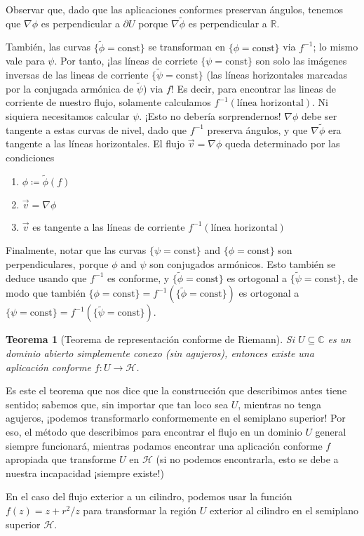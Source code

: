 \documentclass{article}
\newcommand{\realNumbers}{\mathbb{R}}
\newcommand{\complexNumbers}{\mathbb{C}}
\newcommand{\upperHalfPlane}{\mathcal{H}}
\newtheorem{theorem}{Teorema}
\theoremstyle{remark}
\begin{document}
  Observar que, dado que las aplicaciones conformes preservan ángulos, tenemos que \(\nabla \phi\) es perpendicular a \(\partial U\) porque \(\nabla \tilde{\phi}\) es perpendicular a \(\realNumbers\).

  También, las curvas \(\{\tilde{\phi} = \text{const}\}\) se transforman en \(\{\phi = \text{const}\}\) via \(f^{- 1}\);
  lo mismo vale para \(\psi\).
  Por tanto, ¡las líneas de corriete \(\{\psi = \text{const}\}\) son solo las imágenes inversas de las lineas de corriente \(\{\tilde{\psi} = \text{const}\}\) (las líneas horizontales marcadas por la conjugada armónica de \(\tilde{\psi}\)) via \(f\)!
  Es decir, para encontrar las lineas de corriente de nuestro flujo, solamente calculamos \(f^{- 1}(\text{línea horizontal})\).
  Ni siquiera necesitamos calcular \(\psi\).
  ¡Esto no debería sorprendernos!
  \(\nabla \phi\) debe ser tangente a estas curvas de nivel, dado que \(f^{- 1}\) preserva ángulos, y que \(\nabla \tilde{\phi}\) era tangente a las líneas horizontales.
  El flujo \(\vec{v} = \nabla \phi\) queda determinado por las condiciones
  \begin{enumerate}
    \item \(\phi \coloneqq \tilde{\phi}(f)\)
    \item \(\vec{v} = \nabla \phi\)
    \item \(\vec{v}\) es tangente a las líneas de corriente \(f^{- 1}(\text{línea horizontal})\)
  \end{enumerate}

  Finalmente, notar que las curvas \(\{\psi = \text{const}\}\) and \(\{\phi = \text{const}\}\) son perpendiculares, porque \(\phi\) and \(\psi\) son conjugados armónicos.
  Esto también se deduce usando que \(f^{- 1}\) es conforme, y \(\{\tilde{\phi} = \text{const}\}\) es ortogonal a \(\{\tilde{\psi} = \text{const}\}\), de modo que también \(\{\phi = \text{const}\} = f^{- 1}(\{\tilde{\phi} = \text{const}\})\) es ortogonal a \(\{\psi = \text{const}\} = f^{- 1}(\{\tilde{\psi} = \text{const}\})\).

  \begin{theorem}[Teorema de representación conforme de Riemann]
    Si \(U \subseteq \complexNumbers\) es un dominio abierto simplemente conexo (sin agujeros), entonces existe una aplicación conforme \(f : U \rightarrow \upperHalfPlane\).
  \end{theorem}
  Es este el teorema que nos dice que la construcción que describimos antes tiene sentido;
  sabemos que, sin importar que tan loco sea \(U\), mientras no tenga agujeros, ¡podemos transformarlo conformemente en el semiplano superior!
  Por eso, el método que describimos para encontrar el flujo en un dominio \(U\) general siempre funcionará, mientras podamos encontrar una aplicación conforme \(f\) apropiada que transforme \(U\) en \(\upperHalfPlane\) (si no podemos encontrarla, esto se debe a nuestra incapacidad ¡siempre existe!)

  En el caso del flujo exterior a un cilindro, podemos usar la función \(f(z) = z + r^2 / z\) para transformar la región \(U\) exterior al cilindro en el semiplano superior \(\upperHalfPlane\).
\end{document}
